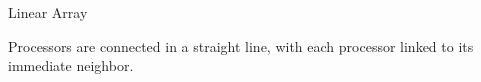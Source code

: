 \documentclass[a4paper, 10pt]{book}
\begin{document}
                    \vspace{0.4cm}
                    \noindent
                    \begin{minipage}{0.49\linewidth} %
                        \begin{tcolorbox}[colframe=black!50, colback=white, size=small]

                            {\bold Linear Array}
                            
                            Processors are connected in a straight line, with each processor linked to its immediate neighbor.

                            \begin{center}
                            \end{center}

                        \end{tcolorbox}
                    \end{minipage}
                    \hfill
\end{document}
